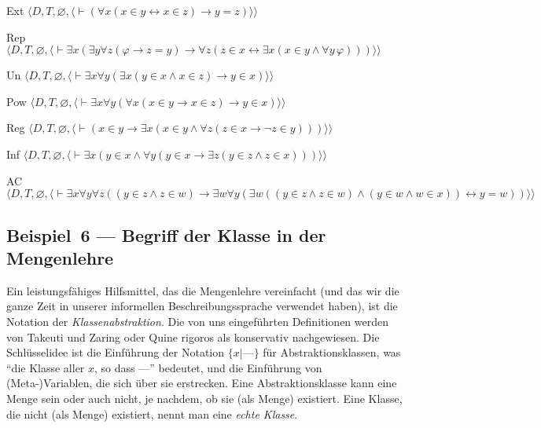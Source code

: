 \begin{list}{}{\itemsep 0.0pt}
      \item[Ext] $\langle D,T,
               \varnothing,
               \langle\vdash (\forall x(x\in y\leftrightarrow x \in z)\to y
               =z) \rangle\rangle$
      \item[Rep] $\langle D,T,
               \varnothing,
               \langle\vdash\exists x ( \exists y \forall z (\varphi \to z = y
                        ) \to
                        \forall z ( z \in x \leftrightarrow \exists x ( x \in
                        y \wedge \forall y\,\varphi ) ) )\rangle\rangle$
      \item[Un] $\langle D,T,
               \varnothing,
               \langle\vdash \exists x \forall y ( \exists x ( y \in x \wedge
               x \in z ) \to y \in x ) \rangle\rangle$
      \item[Pow] $\langle D,T,
               \varnothing,
               \langle\vdash \exists x \forall y ( \forall x ( x \in y \to x
               \in z ) \to y \in x ) \rangle\rangle$
      \item[Reg] $\langle D,T,
               \varnothing,
               \langle\vdash (  x \in y \to
                 \exists x ( x \in y \wedge \forall z ( z \in x \to \lnot z
                \in y ) ) ) \rangle\rangle$
      \item[Inf] $\langle D,T,
               \varnothing,
               \langle\vdash \exists x(y\in x\wedge\forall y(y\in
               x\to
               \exists z(y \in z\wedge z\in x))) \rangle\rangle$
      \item[AC] $\langle D,T,
               \varnothing,
               \langle\vdash \exists x \forall y \forall z ( ( y \in z
               \wedge z \in w ) \to \exists w \forall y ( \exists w
              ( ( y \in z \wedge z \in w ) \wedge ( y \in w \wedge w \in x
              ) ) \leftrightarrow y = w ) ) \rangle\rangle$
\end{list}

\subsection{Beispiel~6 --- Begriff der Klasse in der Mengenlehre}\label{class}

Ein leistungsfähiges Hilfsmittel, das die Mengenlehre vereinfacht (und das wir die ganze Zeit in unserer informellen Beschreibungssprache verwendet haben), ist die Notation der {\em Klassenabstraktion}.  Die von uns eingeführten Definitionen werden von Takeuti und Zaring \cite{Takeuti} oder Quine \cite{Quine} rigoros als konservativ nachgewiesen.  Die Schlüsselidee ist die Einführung der Notation $\{x|\mbox{---}\}$ für Abstraktionsklassen, was "`die Klasse aller $x$, so dass ---"' bedeutet, und die Einführung von (Meta-)Variablen, die sich über sie erstrecken.  Eine Abstraktionsklasse kann eine Menge sein oder auch nicht, je nachdem, ob sie (als Menge) existiert.  Eine Klasse, die nicht (als Menge) existiert, nennt man eine {\em echte Klasse}.

